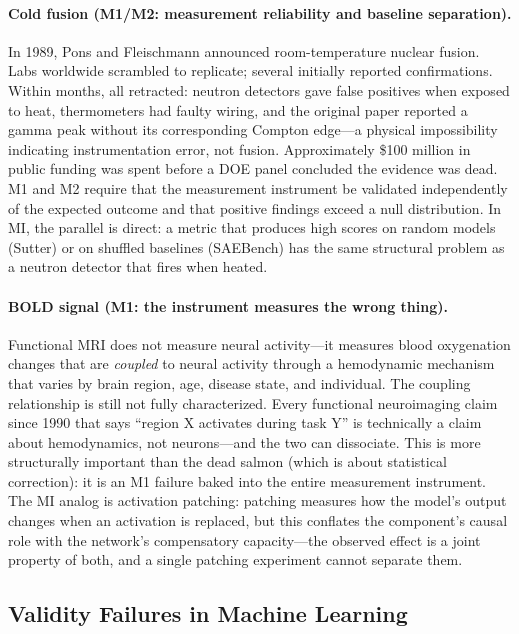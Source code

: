 \documentclass[10pt]{article}
\begin{document}
\paragraph{Cold fusion (M1/M2: measurement reliability and baseline separation).}
In 1989, Pons and Fleischmann announced room-temperature nuclear fusion. Labs worldwide scrambled to replicate; several initially reported confirmations. Within months, all retracted: neutron detectors gave false positives when exposed to heat, thermometers had faulty wiring, and the original paper reported a gamma peak without its corresponding Compton edge---a physical impossibility indicating instrumentation error, not fusion. Approximately \$100 million in public funding was spent before a DOE panel concluded the evidence was dead. M1 and M2 require that the measurement instrument be validated independently of the expected outcome and that positive findings exceed a null distribution. In MI, the parallel is direct: a metric that produces high scores on random models (Sutter) or on shuffled baselines (SAEBench) has the same structural problem as a neutron detector that fires when heated.

\paragraph{BOLD signal (M1: the instrument measures the wrong thing).}
Functional MRI does not measure neural activity---it measures blood oxygenation changes that are \emph{coupled} to neural activity through a hemodynamic mechanism that varies by brain region, age, disease state, and individual. The coupling relationship is still not fully characterized. Every functional neuroimaging claim since 1990 that says ``region X activates during task Y'' is technically a claim about hemodynamics, not neurons---and the two can dissociate. This is more structurally important than the dead salmon (which is about statistical correction): it is an M1 failure baked into the entire measurement instrument. The MI analog is activation patching: patching measures how the model's output changes when an activation is replaced, but this conflates the component's causal role with the network's compensatory capacity---the observed effect is a joint property of both, and a single patching experiment cannot separate them.

\subsection{Validity Failures in Machine Learning}
\end{document}
